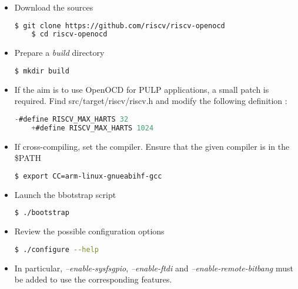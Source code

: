 \documentclass{article}
\begin{document}
    \begin{itemize}
    
    \item Download the sources
    
    \begin{lstlisting}[language=bash]
    $ git clone https://github.com/riscv/riscv-openocd
    $ cd riscv-openocd
    \end{lstlisting}
    
    \item Prepare a \textit{build} directory
    
    \begin{lstlisting}[language=bash]
    $ mkdir build
    \end{lstlisting}
    
    \item If the aim is to use OpenOCD for PULP applications, a small patch is required. Find src/target/riscv/riscv.h and modify the following definition :
    
    \begin{lstlisting}[language=C]
    -#define RISCV_MAX_HARTS 32
    +#define RISCV_MAX_HARTS 1024
    \end{lstlisting}
    
    \item If cross-compiling, set the compiler. Ensure that the given compiler is in the \$PATH
    	
    \begin{lstlisting}[language=bash]
    $ export CC=arm-linux-gnueabihf-gcc
    \end{lstlisting}
    
    \item Launch the bbotstrap script
    	
    \begin{lstlisting}[language=bash]
    $ ./bootstrap
    \end{lstlisting}
    
    \item Review the possible configuration options
    	
    \begin{lstlisting}[language=bash]
    $ ./configure --help
    \end{lstlisting}
    
    \item In particular, \textit{--enable-sysfsgpio}, \textit{--enable-ftdi} and \textit{--enable-remote-bitbang} must be added to use the corresponding features.
    

\end{itemize}
\end{document}
